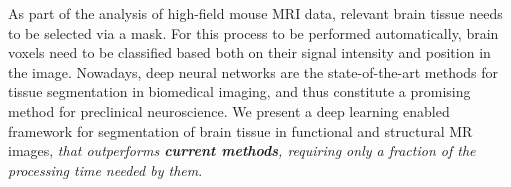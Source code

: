 As part of the analysis of high-field mouse MRI data, relevant brain tissue needs to be selected via a mask.
For this process to be performed automatically, brain voxels need to be classified based both on their signal intensity and position in the image.
Nowadays, deep neural networks are the state-of-the-art methods for tissue segmentation in biomedical imaging, and thus constitute a promising method for preclinical neuroscience.
We present a deep learning enabled framework for segmentation of brain tissue in functional and structural MR images, \textit{that outperforms \textbf{current methods}, requiring only a fraction of the processing time needed by them}. 
